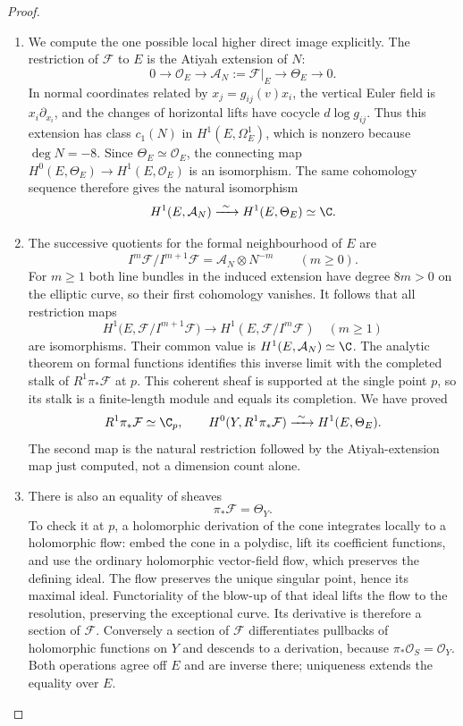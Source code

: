 \begin{proof}
\begin{enumerate}[label=\arabic*.,leftmargin=*]
\item We compute the one possible local higher direct image explicitly.
The restriction of $\mathcal F$ to $E$ is the Atiyah extension
of $N$:
\[
 0\longrightarrow\mathcal O_E
 \longrightarrow\mathcal A_N:=\mathcal F|_E
 \longrightarrow\Theta_E\longrightarrow0.
\]
In normal coordinates related by $x_j=g_{ij}(v)x_i$, the
vertical Euler field is $x_i\partial_{x_i}$, and the changes of
horizontal lifts have cocycle $d\log g_{ij}$.
Thus this extension has class $c_1(N)$ in
$H^1(E,\Omega^1_E)$, which is nonzero because $\deg N=-8$.
Since $\Theta_E\simeq\mathcal O_E$, the connecting map
$H^0(E,\Theta_E)\to H^1(E,\mathcal O_E)$ is an isomorphism.
The same cohomology sequence therefore gives the natural
isomorphism
\[
 H^1(E,\mathcal A_N)\xrightarrow{\ \sim\ }
 H^1(E,\Theta_E)\simeq\C.
\]

\item The successive quotients for the formal neighbourhood of $E$ are
\[
 I^m\mathcal F/I^{m+1}\mathcal F
     =\mathcal A_N\otimes N^{-m}\qquad(m\ge0).
\]
For $m\ge1$ both line bundles in the induced extension have
degree $8m>0$ on the elliptic curve, so their first cohomology
vanishes.  It follows that all restriction maps
\[
 H^1\bigl(E,\mathcal F/I^{m+1}\mathcal F\bigr)
 \longrightarrow H^1(E,\mathcal F/I^m\mathcal F)
 \quad(m\ge1)
\]
are isomorphisms.  Their common value is
$H^1(E,\mathcal A_N)\simeq\C$.
The analytic theorem on formal functions
\citep[Section~6, Hauptsatz~IIa, p.~59]{Grauert1960D}
identifies this inverse limit with the completed stalk of
$R^1\pi_*\mathcal F$ at $p$.
This coherent sheaf is supported at the single point $p$,
so its stalk is a finite-length module and equals its completion.
We have proved
\[
 R^1\pi_*\mathcal F\simeq\C_p,
 \qquad
 H^0(Y,R^1\pi_*\mathcal F)
    \xrightarrow{\ \sim\ }H^1(E,\Theta_E).
\]
The second map is the natural restriction followed by the
Atiyah-extension map just computed, not a dimension count alone.

\item There is also an equality of sheaves
\[
 \pi_*\mathcal F=\Theta_Y.
\]
To check it at $p$, a holomorphic derivation of the cone
integrates locally to a holomorphic flow: embed the cone in a
polydisc, lift its coefficient functions, and use the ordinary
holomorphic vector-field flow, which preserves the defining ideal.
The flow preserves the unique singular point, hence its maximal
ideal.  Functoriality of the blow-up of that ideal lifts the flow
to the resolution, preserving the exceptional curve.
Its derivative is therefore a section of $\mathcal F$.
Conversely a section of $\mathcal F$ differentiates pullbacks
of holomorphic functions on $Y$ and descends to a derivation,
because $\pi_*\mathcal O_S=\mathcal O_Y$.
Both operations agree off $E$ and are inverse there; uniqueness
extends the equality over $E$.


\end{enumerate}
\end{proof}
